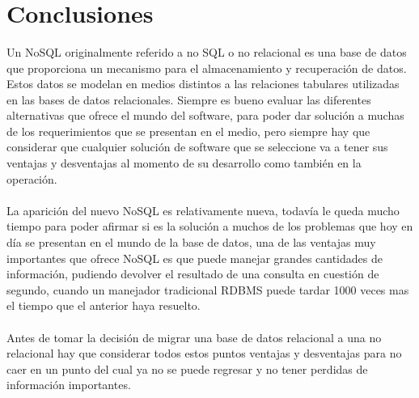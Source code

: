 \documentclass[twoside,twocolumn]{article}
\begin{document}
\begin{flushright}
\begin{itemize}
\textbf{}\\
\textbf{}\\
\textbf{}\\
\section{Conclusiones}
Un NoSQL originalmente referido a no SQL o no relacional es una base de datos que proporciona un mecanismo para el almacenamiento y recuperación de datos. Estos datos se modelan en medios distintos a las relaciones tabulares utilizadas en las bases de datos relacionales. 
Siempre es bueno evaluar las diferentes alternativas que ofrece el mundo del software, para poder dar solución a muchas de los requerimientos que se presentan en el medio, pero siempre hay que considerar que cualquier solución de software que se seleccione va a tener sus ventajas y desventajas al momento de su desarrollo como también en la operación.\textbf{}\\
\textbf{}\\
La aparición del nuevo NoSQL es relativamente nueva, todavía le queda mucho tiempo para poder afirmar si es la solución a muchos de los problemas que hoy en día se presentan en el mundo de la base de datos, una de las ventajas muy importantes que ofrece NoSQL es que puede manejar grandes cantidades de información, pudiendo devolver el resultado de una consulta en cuestión de segundo, cuando un manejador tradicional RDBMS puede tardar 1000 veces mas el tiempo que el anterior haya resuelto. \textbf{}\\
\textbf{}\\
Antes de tomar la decisión de migrar una base de datos relacional a una no relacional hay que considerar todos estos puntos ventajas y desventajas para no caer en un punto del cual ya no se puede regresar y no tener perdidas de información importantes.




\textbf{}\\
\textbf{}\\

\begin{thebibliography}{99} %




\end{thebibliography}
\end{itemize}
\end{flushright}
\end{document}
